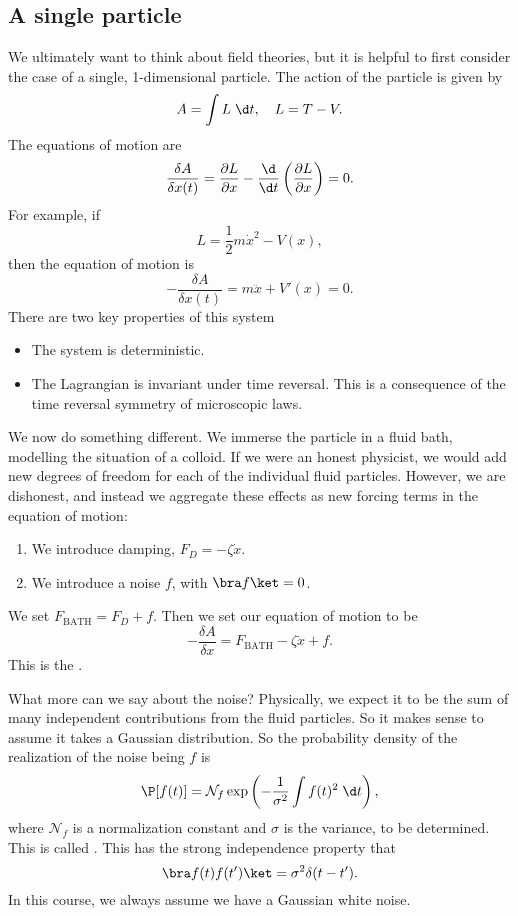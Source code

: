 \documentclass[a4paper]{article}
\begin{document}
\subsection{A single particle}
We ultimately want to think about field theories, but it is helpful to first consider the case of a single, 1-dimensional particle. The action of the particle is given by
\[
  A = \int L\;\d t,\quad L = T - V.
\]
The equations of motion are
\[
  \frac{\delta A}{\delta x(t)} = \frac{\partial L}{\partial x} - \frac{\d}{\d t} \left(\frac{\partial L}{\partial x}\right) = 0.
\]
For example, if
\[
  L = \frac{1}{2} m\dot{x}^2 - V(x),
\]
then the equation of motion is
\[
  -\frac{\delta A}{\delta x(t)} = m\ddot{x} + V'(x) = 0.
\]
There are two key properties of this system
\begin{itemize}
  \item The system is deterministic.
  \item The Lagrangian is invariant under time reversal. This is a consequence of the time reversal symmetry of microscopic laws.
\end{itemize}
We now do something different. We immerse the particle in a fluid bath, modelling the situation of a colloid. If we were an honest physicist, we would add new degrees of freedom for each of the individual fluid particles. However, we are dishonest, and instead we aggregate these effects as new forcing terms in the equation of motion:
\begin{enumerate}
  \item We introduce damping, $F_D = - \zeta \dot{x}$.
  \item We introduce a noise $f$, with $\bra f \ket = 0$.
\end{enumerate}
We set $F_{\mathrm{BATH}} = F_D + f$. Then we set our equation of motion to be
\[
  -\frac{\delta A}{\delta x} = F_{\mathrm{BATH}} - \zeta \dot{x} + f.
\]
This is the .

What more can we say about the noise? Physically, we expect it to be the sum of many independent contributions from the fluid particles. So it makes sense to assume it takes a Gaussian distribution. So the probability density of the realization of the noise being $f$ is
\[
  \P[f(t)] = \mathcal{N}_f \exp \left(- \frac{1}{\sigma^2} \int f(t)^2 \;\d t\right),
\]
where $\mathcal{N}_f$ is a normalization constant and $\sigma$ is the variance, to be determined. This is called . This has the strong independence property that
\[
  \bra f(t) f(t')\ket = \sigma^2 \delta(t - t').
\]
In this course, we always assume we have a Gaussian white noise.
\end{document}
